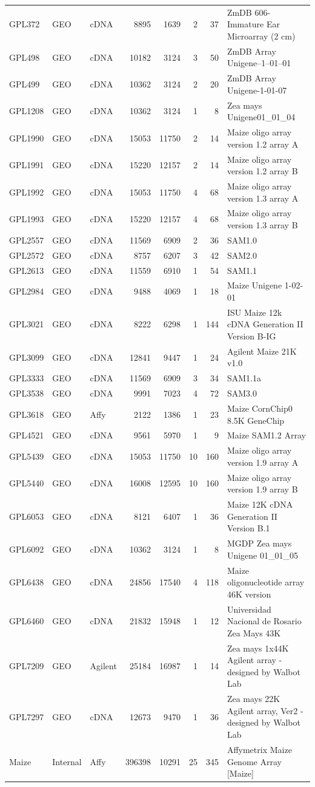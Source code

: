 \begin{ThreePartTable}
\begin{footnotesize}
\begin{longtable}{@{}|>{\centering\arraybackslash}p{1.4cm} | 
>{\centering\arraybackslash}p{.7cm}>{\centering\arraybackslash}p{.8cm} rrrr 
>{\scriptsize\raggedright}p{3.5cm} |@{}}
GPL372 & GEO & cDNA & 8895 & 1639 & 2 & 37 & 
	ZmDB 606-Immature Ear Microarray (2 cm) \tabularnewline
GPL498 & GEO & cDNA & 10182 & 3124 & 3 & 50 & 
	ZmDB Array Unigene--1--01--01 \tabularnewline
GPL499 & GEO & cDNA & 10362 & 3124 & 2 & 20 & 
	ZmDB Array Unigene-1-01-07 \tabularnewline
GPL1208 & GEO & cDNA & 10362 & 3124 & 1 & 8 & 
	Zea mays Unigene01\_01\_04 \tabularnewline
GPL1990 & GEO & cDNA & 15053 & 11750 & 2 & 14 & 
	Maize oligo array version 1.2 array A \tabularnewline
GPL1991 & GEO & cDNA & 15220 & 12157 & 2 & 14 & 
	Maize oligo array version 1.2 array B \tabularnewline
GPL1992 & GEO & cDNA & 15053 & 11750 & 4 & 68 &	
	Maize oligo array version 1.3 array A \tabularnewline
GPL1993 & GEO & cDNA & 15220 & 12157 & 4 & 68 &	
	Maize oligo array version 1.3 array B \tabularnewline
GPL2557 & GEO & cDNA & 11569 & 6909 & 2 & 36 & SAM1.0 \tabularnewline
GPL2572 & GEO & cDNA & 8757 & 6207 & 3 & 42 & SAM2.0 \tabularnewline
GPL2613 & GEO & cDNA & 11559 & 6910 & 1 & 54 & SAM1.1 \tabularnewline
GPL2984 & GEO & cDNA & 9488 & 4069 & 1 & 18 & 
	Maize Unigene 1-02-01 \tabularnewline
GPL3021 & GEO & cDNA & 8222 & 6298 & 1 & 144 & 
	ISU Maize 12k cDNA Generation II Version B-IG \tabularnewline
GPL3099 & GEO & cDNA & 12841 & 9447 & 1 & 24 &	
	Agilent Maize 21K v1.0 \tabularnewline
GPL3333 & GEO & cDNA & 11569 & 6909 & 3 & 34 & SAM1.1a \tabularnewline
GPL3538 & GEO & cDNA & 9991 & 7023 & 4 & 72 & SAM3.0 \tabularnewline
GPL3618 & GEO & Affy & 2122 & 1386 & 1 & 23 &	
	Maize CornChip0 8.5K GeneChip \tabularnewline
GPL4521 & GEO & cDNA & 9561 & 5970 & 1 & 9 & Maize SAM1.2 Array \tabularnewline
GPL5439 & GEO & cDNA & 15053 & 11750 & 10 & 160 & 
	Maize oligo array version 1.9 array A \tabularnewline
GPL5440 & GEO & cDNA & 16008 & 12595 & 10 & 160 & 
	Maize oligo array version 1.9 array B \tabularnewline
GPL6053 & GEO & cDNA & 8121 & 6407 & 1 & 36 & 
	Maize 12K cDNA Generation II Version B.1 \tabularnewline
GPL6092 & GEO & cDNA & 10362 & 3124 & 1 & 8 & 
	MGDP Zea mays Unigene 01\_01\_05 \tabularnewline
GPL6438 & GEO & cDNA & 24856 & 17540 & 4 & 118 & 
	Maize oligonucleotide array 46K version \tabularnewline
GPL6460 & GEO & cDNA & 21832 & 15948 & 1 & 12 & 
	Universidad Nacional de Rosario Zea Mays 43K \tabularnewline
GPL7209 & GEO & Agilent & 25184 & 16987 & 1 & 14 & 
	Zea mays 1x44K Agilent array - designed by Walbot Lab \tabularnewline
GPL7297 & GEO & cDNA & 12673 & 9470 & 1 & 36 & 
	Zea mays 22K Agilent array, Ver2 - designed by Walbot Lab \tabularnewline
Maize & Internal\tnote{2} & Affy & 396398 & 10291 & 25 & 345 & 
	Affymetrix Maize Genome Array [Maize] \tabularnewline
\bottomrule
\end{longtable}
\end{footnotesize}
\end{ThreePartTable}




